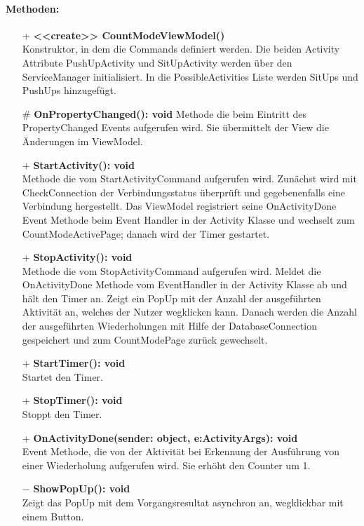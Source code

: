 \documentclass[a4paper,12pt]{article}
\begin{document}
\paragraph{Methoden:}
\begin{itemize}
	\item[+] \textbf{<<create>> CountModeViewModel()} \\ Konstruktor, in dem die Commands definiert werden. Die beiden Activity Attribute PushUpActivity und SitUpActivity werden über den ServiceManager initialisiert. In die PossibleActivities Liste werden SitUps und PushUps hinzugefügt.
	\item[\#] \textbf{OnPropertyChanged(): void} Methode die beim Eintritt des PropertyChanged Events aufgerufen wird. Sie übermittelt der View die Änderungen im ViewModel.
	\item[+] \textbf{StartActivity(): void} \\ Methode die vom StartActivityCommand aufgerufen wird. Zunächst wird mit CheckConnection der Verbindungsstatus überprüft und gegebenenfalls eine Verbindung hergestellt. Das ViewModel registriert seine OnActivityDone Event Methode beim Event Handler in der Activity Klasse und wechselt zum CountModeActivePage; danach wird der Timer gestartet. 
	\item[+] \textbf{StopActivity(): void} \\ Methode die vom StopActivityCommand aufgerufen wird. Meldet die OnActivityDone Methode vom EventHandler in der Activity Klasse ab und hält den Timer an. Zeigt ein PopUp mit der Anzahl der ausgeführten Aktivität an, welches der Nutzer wegklicken kann. Danach werden die Anzahl der ausgeführten Wiederholungen mit Hilfe der DatabaseConnection gespeichert und zum CountModePage zurück gewechselt. 
	\item[+] \textbf{StartTimer(): void} \\ Startet den Timer. 
	\item[+] \textbf{StopTimer(): void} \\ Stoppt den Timer. 
	\item[+] \textbf{OnActivityDone(sender: object, e:ActivityArgs): void} \\ Event Methode, die von der Aktivität bei Erkennung der Ausführung von einer Wiederholung aufgerufen wird. Sie erhöht den Counter um 1. 
	\item[$-$] \textbf{ShowPopUp(): void} \\ Zeigt das PopUp mit dem Vorgangsresultat asynchron an, wegklickbar mit einem Button. 
\end{itemize}
\end{document}
